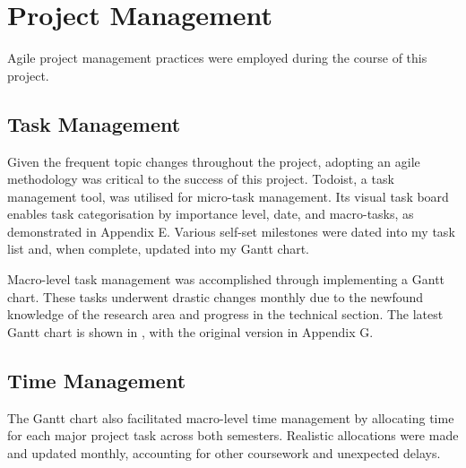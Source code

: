 

\section {Project Management}

Agile project management practices were employed during the course of this project. 

\subsection{Task Management}

Given the frequent topic changes throughout the project, adopting an agile methodology was critical to the success of this project. Todoist, a task management tool, was utilised for micro-task management. Its visual task board enables task categorisation by importance level, date, and macro-tasks, as demonstrated in Appendix E. Various self-set milestones were dated into my task list and, when complete, updated into my Gantt chart.

Macro-level task management was accomplished through implementing a Gantt chart. These tasks underwent drastic changes monthly due to the newfound knowledge of the research area and progress in the technical section. The latest Gantt chart is shown in , with the original version in Appendix G. 

\subsection{Time Management}

The Gantt chart also facilitated macro-level time management by allocating time for each major project task across both semesters. Realistic allocations were made and updated monthly, accounting for other coursework and unexpected delays. 

